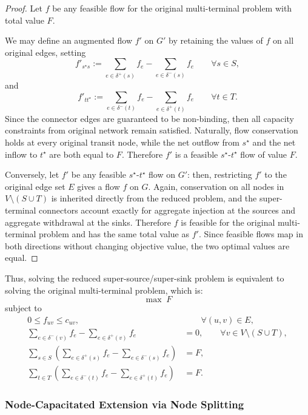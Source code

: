 \documentclass[12pt]{report}
\begin{document}
\begin{proof}
Let \(f\) be any feasible flow for the original multi-terminal problem with total value \(F\).

We may define an augmented flow \(f'\) on \(G'\) by retaining the values of \(f\) on all original edges, setting
\[
f'_{s^\star s}:=\sum_{e\in\delta^+(s)} f_e - \sum_{e\in\delta^-(s)} f_e \qquad \forall s\in S,
\]
and
\[
f'_{t t^\star}:=\sum_{e\in\delta^-(t)} f_e - \sum_{e\in\delta^+(t)} f_e \qquad \forall t\in T.
\]
Since the connector edges are guaranteed to be non-binding, then all capacity constraints from original network remain satisfied. Naturally, flow conservation holds at every original transit node, while the net outflow from \(s^\star\) and the net inflow to \(t^\star\) are both equal to \(F\). Therefore \(f'\) is a feasible \(s^\star\)-\(t^\star\) flow of value \(F\).

Conversely, let \(f'\) be any feasible \(s^\star\)-\(t^\star\) flow on \(G'\): then, restricting \(f'\) to the original edge set \(E\) gives a flow \(f\) on \(G\). Again, conservation on all nodes in \(V\setminus(S\cup T)\) is inherited directly from the reduced problem, and the super-terminal connectors account exactly for aggregate injection at the sources and aggregate withdrawal at the sinks. Therefore \(f\) is feasible for the original multi-terminal problem and has the same total value as \(f'\). Since feasible flows map in both directions without changing objective value, the two optimal values are equal.
\end{proof}

Thus, solving the reduced super-source/super-sink problem is equivalent to solving the original multi-terminal problem, which is:
\[
\max\; F
\]
subject to
\begin{align}
0 \le f_{uv} \le c_{uv}, &\qquad \forall (u,v)\in E, \\
\sum_{e\in\delta^-(v)} f_e - \sum_{e\in\delta^+(v)} f_e &= 0,
\qquad \forall v\in V\setminus(S\cup T), \label{eq:msss-transit}\\
\sum_{s\in S}\left(\sum_{e\in\delta^+(s)} f_e - \sum_{e\in\delta^-(s)} f_e\right) &= F, \label{eq:msss-source}\\
\sum_{t\in T}\left(\sum_{e\in\delta^-(t)} f_e - \sum_{e\in\delta^+(t)} f_e\right) &= F. \label{eq:msss-sink}
\end{align}


\subsubsection{Node-Capacitated Extension via Node Splitting}
\label{sec:node_splitting}
\end{document}
